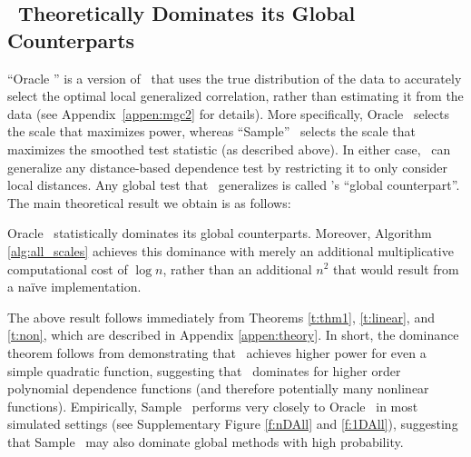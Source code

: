 \documentclass[11pt]{article}
\begin{document}
\subsection*{\Mgc~Theoretically Dominates its Global Counterparts }
\label{s:theory}

``Oracle \Mgc'' is a version of \Mgc~that uses the true distribution of the data to accurately select the optimal local generalized correlation, rather than estimating it from the data (see Appendix~\ref{appen:mgc2} for details). More specifically, Oracle \Mgc~selects the scale that maximizes power, whereas ``Sample'' \Mgc~selects the scale that maximizes the smoothed test statistic (as described above). 
In either case,  \Mgc~can generalize any distance-based dependence test by restricting it to only consider local distances.  Any global test that \Mgc~generalizes is called \Mgc's ``global counterpart''.  The main theoretical result we obtain is as follows:
% 
\begin{thm} \label{t:dominate}
Oracle \Mgc~statistically dominates its global counterparts. 
% 
% 
Moreover, Algorithm \ref{alg:all_scales} achieves this dominance with merely an additional multiplicative computational cost of $\log n$, rather than an additional $n^2$ that would result from a na\"ive implementation.
\end{thm}

The above result follows immediately from Theorems \ref{t:thm1}, \ref{t:linear}, and \ref{t:non}, which are described in Appendix \ref{appen:theory}. In short, the dominance theorem follows from demonstrating that \Mgc~achieves higher power for even a simple quadratic function, suggesting that \Mgc~dominates for higher order polynomial dependence functions (and therefore potentially many nonlinear functions).
Empirically, Sample \Mgc~performs very closely to Oracle \Mgc~in most simulated settings (see Supplementary Figure \ref{f:nDAll} and \ref{f:1DAll}), suggesting that Sample \Mgc~may also dominate global methods with high probability. 
\end{document}
